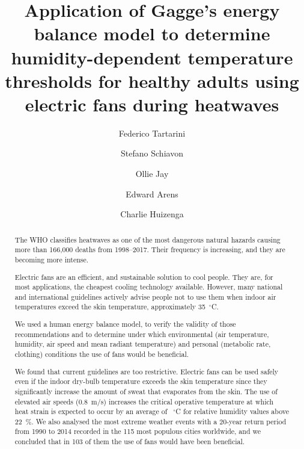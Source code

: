 
\begin{frontmatter}

\title{Application of Gagge's energy balance model to determine humidity-dependent temperature thresholds for healthy adults using electric fans during heatwaves}

\author[sinBerBest]{Federico Tartarini}
\author[CBE]{Stefano Schiavon}
\author[USYD]{Ollie Jay}
\author[CBE]{Edward Arens}
\author[CBE]{Charlie Huizenga}

\address[sinBerBest]{SinBerBEST, Berkeley Education Alliance for Research in Singapore, Singapore}
\address[CBE]{Center for the Built Environment, University of California, Berkeley, USA}
\address[USYD]{Sydney School of Health Sciences, Faculty of Medicine and Health, The University of Sydney, Sydney, Australia}

\begin{abstract}
    The WHO classifies heatwaves as one of the most dangerous natural hazards causing more than 166,000 deaths from 1998--2017.
    Their frequency is increasing, and they are becoming more intense.

    Electric fans are an efficient, and sustainable solution to cool people.
    They are, for most applications, the cheapest cooling technology available.
    However, many national and international guidelines actively advise people not to use them when indoor air temperatures exceed the skin temperature, approximately 35~$^{\circ}$C\@.

    We used a human energy balance model, to verify the validity of those recommendations and to determine under which environmental (air temperature, humidity, air speed and mean radiant temperature) and personal (metabolic rate, clothing) conditions the use of fans would be beneficial.

    We found that current guidelines are too restrictive.
    Electric fans can be used safely even if the indoor dry-bulb temperature exceeds the skin temperature since they significantly increase the amount of sweat that evaporates from the skin.
    The use of elevated air speeds (0.8~m/s) increases the critical operative temperature at which heat strain is expected to occur by an average of ~$^{\circ}$C for relative humidity values above 22~\%\@.
    We also analysed the most extreme weather events with a 20-year return period from 1990 to 2014 recorded in the 115 most populous cities worldwide, and we concluded that in 103 of them the use of fans would have been beneficial.


\end{abstract}
\end{frontmatter}
